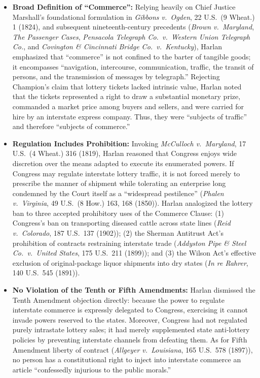 \documentclass[12pt]{article}
\begin{document}
\begin{itemize}
  \item \textbf{Broad Definition of ``Commerce'':} Relying heavily on Chief Justice Marshall's foundational formulation in \textit{Gibbons v.\ Ogden}, 22 U.S.\ (9 Wheat.) 1 (1824), and subsequent nineteenth-century precedents (\textit{Brown v.\ Maryland}, \textit{The Passenger Cases}, \textit{Pensacola Telegraph Co.\ v.\ Western Union Telegraph Co.}, and \textit{Covington \& Cincinnati Bridge Co.\ v.\ Kentucky}), Harlan emphasized that ``commerce'' is not confined to the barter of tangible goods; it encompasses ``navigation, intercourse, communication, traffic, the transit of persons, and the transmission of messages by telegraph.'' Rejecting Champion's claim that lottery tickets lacked intrinsic value, Harlan noted that the tickets represented a right to draw a substantial monetary prize, commanded a market price among buyers and sellers, and were carried for hire by an interstate express company. Thus, they were ``subjects of traffic'' and therefore ``subjects of commerce.''
  \item \textbf{Regulation Includes Prohibition:} Invoking \textit{McCulloch v.\ Maryland}, 17 U.S.\ (4 Wheat.) 316 (1819), Harlan reasoned that Congress enjoys wide discretion over the means adapted to execute its enumerated powers. If Congress may regulate interstate lottery traffic, it is not forced merely to prescribe the manner of shipment while tolerating an enterprise long condemned by the Court itself as a ``widespread pestilence'' (\textit{Phalen v.\ Virginia}, 49 U.S.\ (8 How.) 163, 168 (1850)). Harlan analogized the lottery ban to three accepted prohibitory uses of the Commerce Clause: (1) Congress's ban on transporting diseased cattle across state lines (\textit{Reid v.\ Colorado}, 187 U.S.\ 137 (1902)); (2) the Sherman Antitrust Act's prohibition of contracts restraining interstate trade (\textit{Addyston Pipe \& Steel Co.\ v.\ United States}, 175 U.S.\ 211 (1899)); and (3) the Wilson Act's effective exclusion of original-package liquor shipments into dry states (\textit{In re Rahrer}, 140 U.S.\ 545 (1891)).
  \item \textbf{No Violation of the Tenth or Fifth Amendments:} Harlan dismissed the Tenth Amendment objection directly: because the power to regulate interstate commerce is expressly delegated to Congress, exercising it cannot invade powers reserved to the states. Moreover, Congress had not regulated purely intrastate lottery sales; it had merely supplemented state anti-lottery policies by preventing interstate channels from defeating them. As for Fifth Amendment liberty of contract (\textit{Allgeyer v.\ Louisiana}, 165 U.S.\ 578 (1897)), no person has a constitutional right to inject into interstate commerce an article ``confessedly injurious to the public morals.''

\end{itemize}
\end{document}
